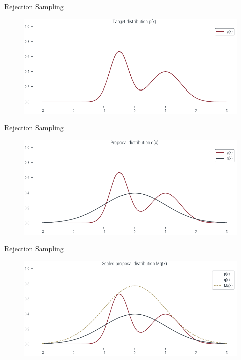 \documentclass{beamer}
\begin{document}
   \begin{frame}{Rejection Sampling}
    \begin{figure}
        \centering
        \includegraphics[scale = 0.75]{../figures/sampling/rejection-sampling--1.0-False-False-False-False-False-False-False-False.pdf}
    \end{figure}
    
   \end{frame}

    \begin{frame}{Rejection Sampling}
        \begin{figure}
            \centering
            \includegraphics[scale = 0.75]{../figures/sampling/rejection-sampling--1.0-True-False-False-False-False-False-False-False.pdf}
        \end{figure}
    \end{frame}

    \begin{frame}{Rejection Sampling}
        \begin{figure}
            \centering
            \includegraphics[scale = 0.75]{../figures/sampling/rejection-sampling--1.0-True-True-False-False-False-False-False-False.pdf}
        \end{figure}
    \end{frame}
\end{document}
